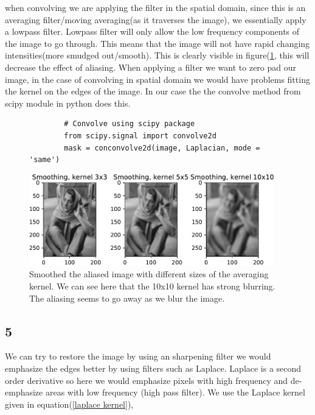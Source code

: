 {when convolving we are applying the filter in the spatial domain, since this is an averaging filter/moving averaging(as it traverses the image), we essentially apply a lowpass filter. Lowpass filter will only allow the low frequency components of the image to go through. This means that the image will not have rapid changing intensities(more smudged out/smooth). This is clearly visible in figure(\ref{smooth}, this will decrease the effect of aliasing.
When applying a filter we want to zero pad our image, in the case of convolving in spatial domain we would have problems fitting the kernel on the edges of the image. In our case the the convolve method from scipy module in python does this.

\begin{figure}[!htb]
    \begin{lstlisting}
        # Convolve using scipy package
        from scipy.signal import convolve2d
        mask = conconvolve2d(image, Laplacian, mode = 'same')
    \end{lstlisting}
\end{figure}

\begin{figure}[!htb]
    {\centering
        \includegraphics[width=0.95\textwidth]{smoothing.pdf}
        \caption{Smoothed the aliased image with different sizes of the averaging kernel. We can see here that the 10x10 kernel has strong blurring. The aliasing seems to go away as we blur the image.}
        \label{smooth}
    \par}
    \end{figure}

\subsection{5}

We can try to restore the image by using an sharpening filter we would emphasize the edges better by using filters such as Laplace. Laplace is a second order derivative so here we would emphasize pixels with high frequency and de-emphasize areas with low frequency (high pass filter). We use the Laplace kernel given in equation(\ref{laplace kernel}),

}
